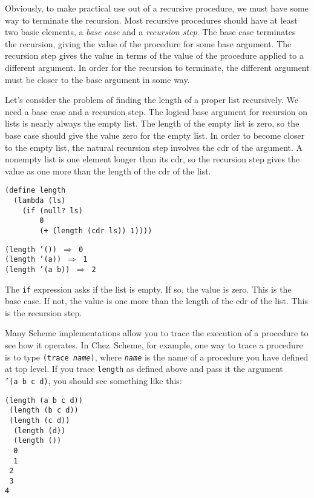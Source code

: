 Obviously, to make practical use out of a recursive procedure, we must
have some way to terminate the recursion.
Most recursive procedures should have at least two basic elements, a
\label{start_s134}\textit{base case} and a \label{start_s135}\textit{recursion step}.
The base case terminates the recursion, giving the value of the
procedure for some base argument.
The recursion step gives the value in terms of the value of the procedure
applied to a different argument.
In order for the recursion to terminate, the different argument must
be closer to the base argument in some way.


\label{start_s136}Let's consider the problem of finding the length of a
proper list recursively.
We need a base case and a recursion step.
The logical base argument for recursion on lists is nearly always the empty
list.
The length of the empty list is zero, so the base case should give the
value zero for the empty list.
In order to become closer to the empty list, the natural recursion step
involves the cdr of the argument.
A nonempty list is one element longer than its cdr, so the recursion
step gives the value as one more than the length of the cdr of the
list\label{start_defn_simplelength}.


\begin{alltt}
(define length
  (lambda (ls)
    (if (null? ls)
        0
        (+ (length (cdr ls)) 1))))
\end{alltt}


\begin{alltt}
(length '()) \(\Rightarrow\) 0
(length '(a)) \(\Rightarrow\) 1
(length '(a b)) \(\Rightarrow\) 2
\end{alltt}


The \texttt{if} expression asks if the list is empty.
If so, the value is zero.
This is the base case.
If not, the value is one more than the length of the cdr of the list.
This is the recursion step.


Many Scheme implementations allow you to trace the execution of a procedure to
see how it operates.
\label{start_s137}\label{start_s138}In
\label{start_s139}Chez Scheme, for example, one way to
trace a procedure is to type \texttt{(trace \textit{name})}, where
\texttt{\textit{name}} is the name of a procedure you have defined at top level.
If you trace \texttt{length} as defined above and pass it the argument
\texttt{'(a b c d)}, you should see something like this:


\begin{alltt}
\textbar{}(length (a b c d))
\textbar{} (length (b c d))
\textbar{} \textbar{}(length (c d))
\textbar{} \textbar{} (length (d))
\textbar{} \textbar{} \textbar{}(length ())
\textbar{} \textbar{} \textbar{}0
\textbar{} \textbar{} 1
\textbar{} \textbar{}2
\textbar{} 3
\textbar{}4
\end{alltt}


